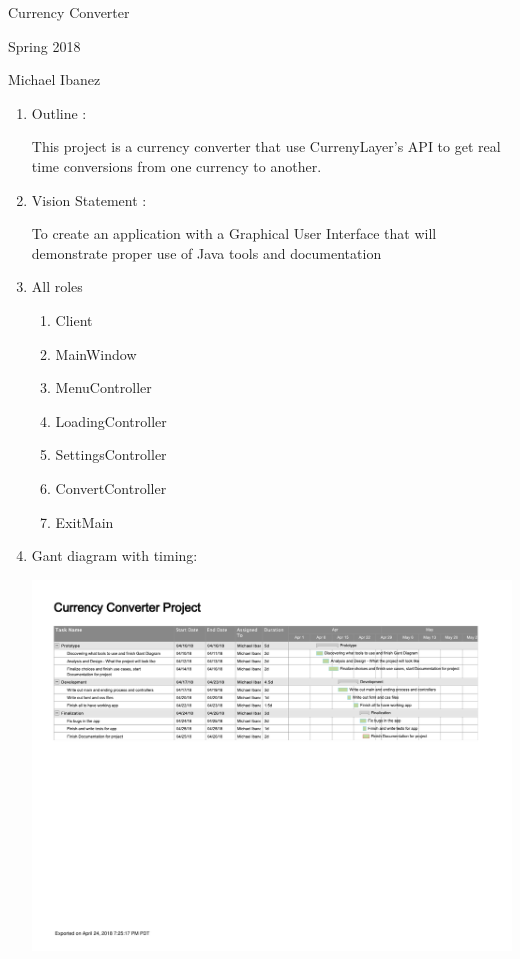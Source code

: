 \documentclass[12pt]{article}
\begin{document}
\begin{center}
\Large{Currency Converter}

\large{Spring 2018}
\end{center}
\vspace{3 mm}
Michael Ibanez
\vspace{5 mm}

\begin{enumerate}

\item   Outline : 

\subitem 
	This project is a currency converter that use CurrenyLayer's API to get real time conversions from one currency to another.


\item   Vision Statement : 
	
\subitem
	To create an application with a Graphical User Interface that will demonstrate proper use of Java tools and documentation


\item   All roles

\begin{enumerate}
	\item Client
	\item MainWindow
	\item MenuController
	\item LoadingController
	\item SettingsController
	\item ConvertController
	\item ExitMain
\end{enumerate}


\item   Gant diagram with timing: 

\includegraphics[scale=0.5]{GantDiagram.pdf}



\end{enumerate}
\end{document}

